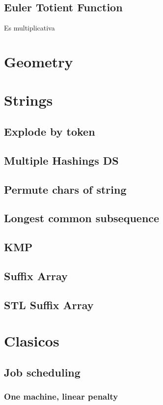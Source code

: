 \subsection{Euler Totient Function}
Es multiplicativa
\section{Geometry}


\section{Strings}
\subsection{Explode by token}
\subsection{Multiple Hashings DS}
\subsection{Permute chars of string}
\subsection{Longest common subsequence}
\subsection{KMP}
\subsection{Suffix Array}
\subsection{STL Suffix Array}
\section{Clasicos}
\subsection{Job scheduling}
\subsubsection{One machine, linear penalty}
